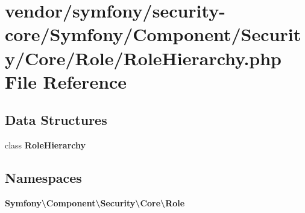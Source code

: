 \section{vendor/symfony/security-\/core/\+Symfony/\+Component/\+Security/\+Core/\+Role/\+Role\+Hierarchy.php File Reference}
\label{_role_hierarchy_8php}
\subsection*{Data Structures}
\begin{DoxyCompactItemize}
\item 
class {\bf Role\+Hierarchy}
\end{DoxyCompactItemize}
\subsection*{Namespaces}
\begin{DoxyCompactItemize}
\item 
 {\bf Symfony\textbackslash{}\+Component\textbackslash{}\+Security\textbackslash{}\+Core\textbackslash{}\+Role}
\end{DoxyCompactItemize}
